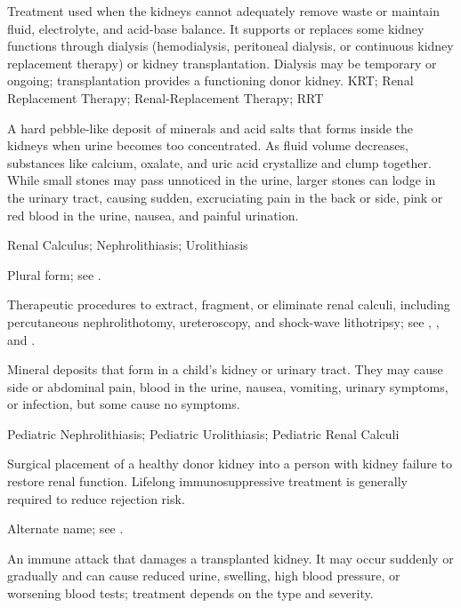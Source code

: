  Treatment used when the kidneys cannot adequately remove waste or maintain fluid, electrolyte, and acid-base balance. It supports or replaces some kidney functions through dialysis (hemodialysis, peritoneal dialysis, or continuous kidney replacement therapy) or kidney transplantation. Dialysis may be temporary or ongoing; transplantation provides a functioning donor kidney.
\synonyms
KRT; Renal Replacement Therapy; Renal-Replacement Therapy; RRT

 A hard pebble-like deposit of minerals and acid salts that forms inside the kidneys when urine becomes too concentrated. As fluid volume decreases, substances like calcium, oxalate, and uric acid crystallize and clump together. While small stones may pass unnoticed in the urine, larger stones can lodge in the urinary tract, causing sudden, excruciating pain in the back or side, pink or red blood in the urine, nausea, and painful urination.

\synonyms
Renal Calculus; Nephrolithiasis; Urolithiasis

 Plural form; see .

 Therapeutic procedures to extract, fragment, or eliminate renal calculi, including percutaneous nephrolithotomy, ureteroscopy, and shock-wave lithotripsy; see , , and .

 Mineral deposits that form in a child’s kidney or urinary tract. They may cause side or abdominal pain, blood in the urine, nausea, vomiting, urinary symptoms, or infection, but some cause no symptoms.

\synonyms
Pediatric Nephrolithiasis; Pediatric Urolithiasis; Pediatric Renal Calculi

 Surgical placement of a healthy donor kidney into a person with kidney failure to restore renal function. Lifelong immunosuppressive treatment is generally required to reduce rejection risk.

 Alternate name; see .

 An immune attack that damages a transplanted kidney. It may occur suddenly or gradually and can cause reduced urine, swelling, high blood pressure, or worsening blood tests; treatment depends on the type and severity.

